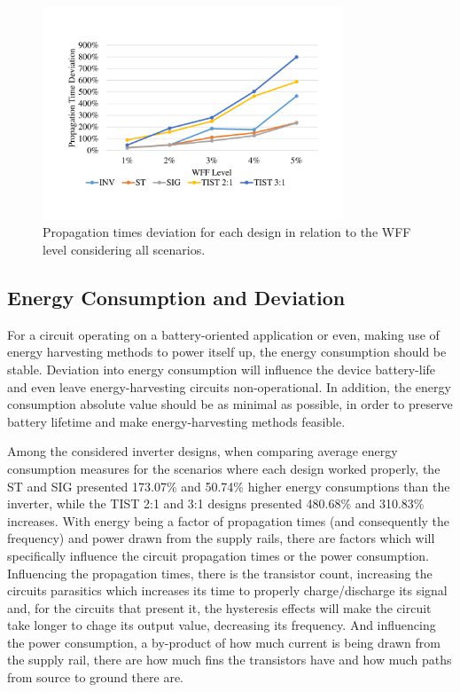 \documentclass[pgmicro,mestrado,english]{iiufrgs}
\begin{document}
\begin{figure}[h]
	\centering
		\includegraphics[width=0.8\textwidth, trim={2cm 3cm 2cm 3cm}, clip]{delayDevWFF.pdf}
		\caption{Propagation times deviation for each design in relation to the WFF level considering all scenarios.}
	\label{fig:delaysDev}
\end{figure}

\subsection{Energy Consumption and Deviation}

For a circuit operating on a battery-oriented application or even, making use of energy harvesting methods to power itself up, the energy consumption should be stable. Deviation into energy consumption will influence the device battery-life and even leave energy-harvesting circuits non-operational. In addition, the energy consumption absolute value should be as minimal as possible, in order to preserve battery lifetime and make energy-harvesting methods feasible.

Among the considered inverter designs, when comparing average energy consumption measures for the scenarios where each design worked properly, the ST and SIG presented 173.07\% and 50.74\% higher energy consumptions than the inverter, while the TIST 2:1 and 3:1 designs presented 480.68\% and 310.83\% increases. With energy being a factor of propagation times (and consequently the frequency) and power drawn from the supply rails, there are factors which will specifically influence the circuit propagation times or the power consumption. Influencing the propagation times, there is the transistor count, increasing the circuits parasitics which increases its time to properly charge/discharge its signal and, for the circuits that present it, the hysteresis effects will make the circuit take longer to chage its output value, decreasing its frequency. And influencing the power consumption, a by-product of how much current is being drawn from the supply rail, there are how much fins the transistors have and how much paths from source to ground there are.
\end{document}
